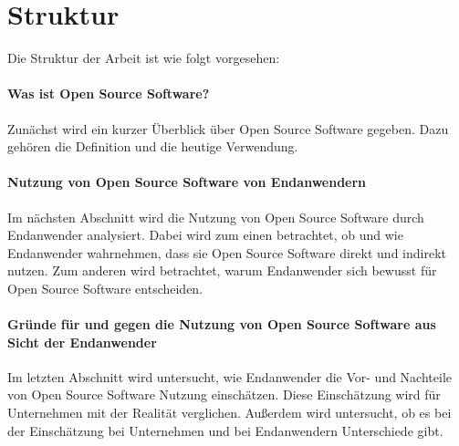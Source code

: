 \documentclass[a4paper]{article}
\begin{document}
	   
	\section{Struktur}
		Die Struktur der Arbeit ist wie folgt vorgesehen:

		\paragraph{Was ist Open Source Software?}
			Zunächst wird ein kurzer Überblick über Open Source Software gegeben. Dazu gehören die Definition und die heutige Verwendung.
		
		\paragraph{Nutzung von Open Source Software von Endanwendern}
			Im nächsten Abschnitt wird die Nutzung von Open Source Software durch Endanwender analysiert. Dabei wird zum einen betrachtet, ob und wie Endanwender wahrnehmen, dass sie Open Source Software direkt und indirekt nutzen.
			Zum anderen wird betrachtet, warum Endanwender sich bewusst für Open Source Software entscheiden.
		
		\paragraph{Gründe für und gegen die Nutzung von Open Source Software aus Sicht der Endanwender}
			Im letzten Abschnitt wird untersucht, wie Endanwender die Vor- und Nachteile von Open Source Software Nutzung einschätzen.
			Diese Einschätzung wird für Unternehmen mit der Realität verglichen.
			Außerdem wird untersucht, ob es bei der Einschätzung bei Unternehmen und bei Endanwendern Unterschiede gibt.
	
    \clearpage
    \nocite{*}
    \printbibliography
\end{document}
